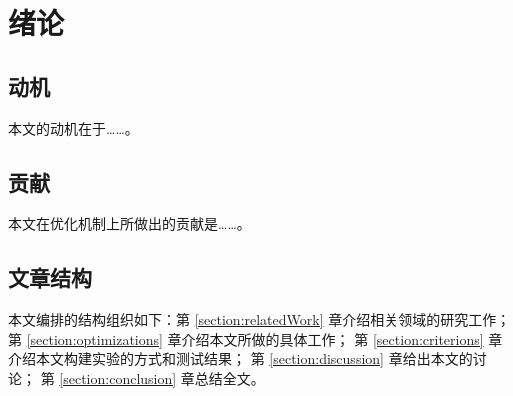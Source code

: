 \section{绪论}
\subsection{动机}
    本文的动机在于……。
\subsection{贡献}
    本文在优化机制上所做出的贡献是……。
\subsection{文章结构}
    本文编排的结构组织如下：第 \ref{section:relatedWork} 章介绍相关领域的研究工作；
    第 \ref{section:optimizations} 章介绍本文所做的具体工作；
    第 \ref{section:criterions} 章介绍本文构建实验的方式和测试结果；
    第 \ref{section:discussion} 章给出本文的讨论；
    第 \ref{section:conclusion} 章总结全文。
